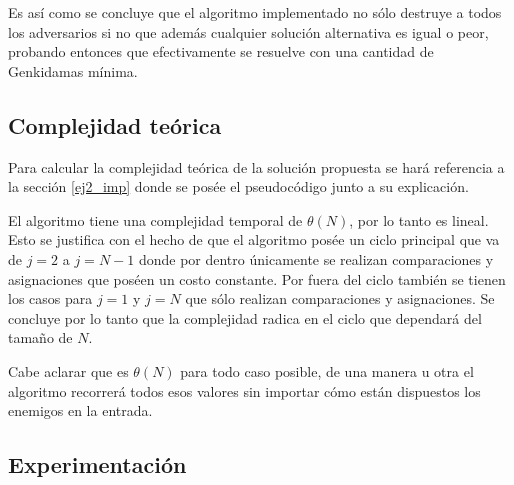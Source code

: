 	Es así como se concluye que el algoritmo implementado no sólo destruye a
	todos los adversarios si no que además cualquier solución alternativa es
	igual o peor, probando entonces que efectivamente se resuelve con una
	cantidad de Genkidamas mínima.

	\subsection{Complejidad teórica}

	Para calcular la complejidad teórica de la solución propuesta se hará
	referencia a la sección \ref{ej2_imp} donde se posée el pseudocódigo junto a
	su explicación.

	El algoritmo tiene una complejidad temporal de $\theta(N)$, por lo tanto es
	lineal. Esto se justifica con el hecho de que el algoritmo posée un ciclo
	principal que va de $j = 2$ a $j = N - 1$ donde por dentro únicamente se
	realizan comparaciones y asignaciones que poséen un costo constante. Por
	fuera del ciclo también se tienen los casos para $j = 1$ y $j = N$ que sólo
	realizan comparaciones y asignaciones. Se concluye por lo tanto que la
	complejidad radica en el ciclo que dependará del tamaño de $N$.

	Cabe aclarar que es $\theta(N)$ para todo caso posible, de una manera u otra
	el algoritmo recorrerá todos esos valores sin importar cómo están dispuestos
	los enemigos en la entrada.


    \subsection{Experimentación}
